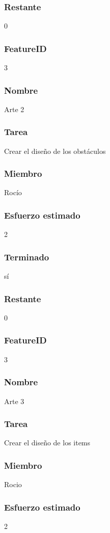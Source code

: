 \subsubsection{Restante} 0



\subsubsection{FeatureID} 3
\subsubsection{Nombre} Arte 2
\subsubsection{Tarea} Crear el diseño de los obstáculos
\subsubsection{Miembro} Rocío
\subsubsection{Esfuerzo estimado} 2
\subsubsection{Terminado} sí
\subsubsection{Restante} 0


\subsubsection{FeatureID} 3
\subsubsection{Nombre} Arte 3
\subsubsection{Tarea} Crear el diseño de los items
\subsubsection{Miembro} Rocio
\subsubsection{Esfuerzo estimado} 2
